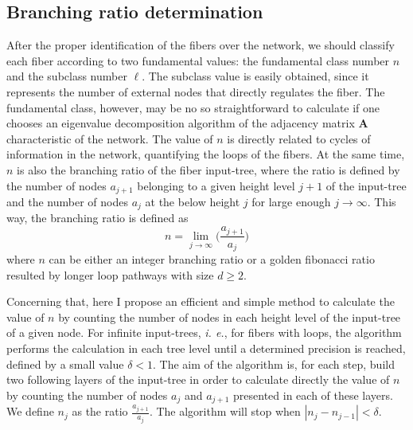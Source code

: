 \documentclass[12pt]{diazessay} %
\begin{document}
\subsection{Branching ratio determination}

After the proper identification of the fibers over the network, we should classify each fiber according to two fundamental values: the fundamental class number $n$ and the subclass number $\ell$. The subclass value is easily obtained, since it represents the number of external nodes that directly regulates the fiber. The fundamental class, however, may be no so straightforward to calculate if one chooses an eigenvalue decomposition algorithm of the adjacency matrix $\mathbf{A}$ characteristic of the network. The value of $n$  is directly related to cycles of information in the network, quantifying the loops of the fibers. At the same time, $n$ is also the branching ratio of the fiber input-tree, where the ratio is defined by the number of nodes $a_{j+1}$ belonging to a given height level $j+1$ of the input-tree and the number of nodes $a_j$ at the below height $j$ for large enough $j \rightarrow \infty$. This way, the branching ratio is defined as
\begin{equation}
	n = \lim _{j \rightarrow \infty}\bigg(\dfrac{a_{j+1}}{a_j}\bigg)
\end{equation}
where $n$ can be either an integer branching ratio or a golden fibonacci ratio resulted by longer loop pathways with size $d \geq 2$. 

Concerning that, here I propose an efficient and simple method to calculate the value of $n$ by counting the number of nodes in each height level of the input-tree of a given node. For infinite input-trees, \textit{i. e.}, for fibers with loops, the algorithm performs the calculation in each tree level until a determined precision is reached, defined by a small value $\delta < 1$. The aim of the algorithm is, for each step, build two following layers of the input-tree in order to calculate directly the value of $n$ by counting the number of nodes $a_j$ and $a_{j+1}$ presented in each of these layers. We define $n_j$ as the ratio $\frac{a_{j+1}}{a_j}$. The algorithm will stop when $|n_j - n_{j-1}| < \delta$.
\end{document}
